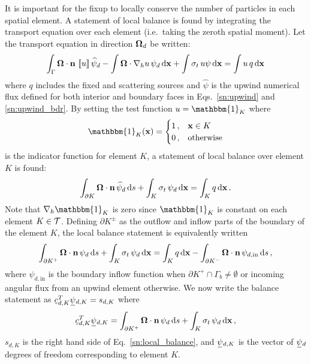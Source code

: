 \documentclass[../doc.tex]{subfiles}
\begin{document}
It is important for the fixup to locally conserve the number of particles in each spatial element. A statement of local balance is found by integrating the transport equation over each element (i.e.~taking the zeroth spatial moment). Let the transport equation in direction $\boldsymbol{\Omega}_d$ be written: 
	\begin{equation}
		\int_{\Gamma} \boldsymbol{\Omega}\cdot\boldsymbol{\mathrm{n}}\,\left\llbracket u \right\rrbracket \widehat{\psi}_d - \int \boldsymbol{\Omega}\cdot\nabla_h u\, \psi_d \mathop{}\!\mathrm{d} \boldsymbol{\mathrm{x}} + \int \sigma_t\, u \psi \mathop{}\!\mathrm{d} \boldsymbol{\mathrm{x}} = \int u\, q \mathop{}\!\mathrm{d} \boldsymbol{\mathrm{x}} 
	\end{equation}
where $q$ includes the fixed and scattering sources and $\widehat{\psi}$ is the upwind numerical flux defined for both interior and boundary faces in Eqs.~\ref{sn:upwind} and \ref{sn:upwind_bdr}. By setting the test function $u = \mathbbm{1}_K$ where 
	\begin{equation}
		\mathbbm{1}_{K}(\x) = \begin{cases} 
			1 \,, & \x \in K \\ 
			0 \,, & \text{otherwise} 
		\end{cases}
	\end{equation}
is the indicator function for element $K$, a statement of local balance over element $K$ is found: 
	\begin{equation}
		\int_{\partial K} \boldsymbol{\Omega}\cdot\boldsymbol{\mathrm{n}}\,\widehat{\psi}_d \mathop{}\!\mathrm{d} s + \int_K \sigma_t\, \psi_d \mathop{}\!\mathrm{d} \boldsymbol{\mathrm{x}} = \int_K q \mathop{}\!\mathrm{d} \boldsymbol{\mathrm{x}} \,. 
	\end{equation}
Note that $\nablah \mathbbm{1}_K$ is zero since $\mathbbm{1}_K$ is constant on each element $K \in \mathcal{T}$. Defining $\partial K^\pm$ as the outflow and inflow parts of the boundary of the element $K$, the local balance statement is equivalently written 
	\begin{equation} \label{sn:local_balance}
		\int_{\partial K^+} \boldsymbol{\Omega}\cdot\boldsymbol{\mathrm{n}}\, \psi_d \mathop{}\!\mathrm{d} s + \int_K \sigma_t\, \psi_d \mathop{}\!\mathrm{d} \boldsymbol{\mathrm{x}} = \int_K q \mathop{}\!\mathrm{d} \boldsymbol{\mathrm{x}} - \int_{\partial K^-} \boldsymbol{\Omega}\cdot\boldsymbol{\mathrm{n}}\,\psi_{d,\text{in}} \mathop{}\!\mathrm{d} s \,, 
	\end{equation}
where $\psi_{d,\text{in}}$ is the boundary inflow function when $\partial K^+ \cap \Gamma_b \neq \emptyset$ or incoming angular flux from an upwind element otherwise. We now write the balance statement as $\ubar{c}_{d,K}^T \ubar{\psi}_{d,K} = s_{d,K}$ where 
	\begin{equation}
	 	\ubar{c}_{d,K}^T \ubar{\psi}_{d,K} = \int_{\partial K^+} \Omegahat\cdot\n\, \psi_d \ud s + \int_K \sigma_t\, \psi_d \ud \x \,,
	\end{equation} 
$s_{d,K}$ is the right hand side of Eq.~\ref{sn:local_balance}, and $\ubar{\psi}_{d,K}$ is the vector of $\ubar{\psi}_d$ degrees of freedom corresponding to element $K$. 
\end{document}
